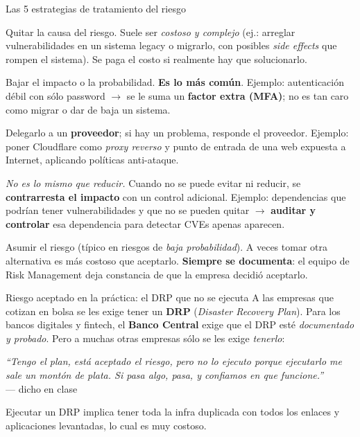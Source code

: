 \documentclass[11pt,a4paper]{article}
\newcommand{\prof}[1]{\par\medskip\noindent\textit{``#1''}\\[-2pt]\hspace*{1em}%
  {\footnotesize\textcolor{black!60}{--- dicho en clase}}\par\medskip\noindent}
\begin{document}
\begin{defbox}{Las 5 estrategias de tratamiento del riesgo}
\begin{description}[leftmargin=0pt,labelsep=0.4em,style=nextline,itemsep=3pt]
  \item[Evitarlo (avoid)] Quitar la causa del riesgo. Suele ser \emph{costoso y complejo}
        (ej.: arreglar vulnerabilidades en un sistema legacy o migrarlo, con posibles
        \emph{side effects} que rompen el sistema). Se paga el costo si realmente hay que
        solucionarlo.
  \item[Reducirlo (reduce/mitigate)] Bajar el impacto o la probabilidad. \textbf{Es lo más
        común}. Ejemplo: autenticación débil con sólo password $\to$ se le suma un
        \textbf{factor extra (MFA)}; no es tan caro como migrar o dar de baja un sistema.
  \item[Transferirlo (transfer)] Delegarlo a un \textbf{proveedor}; si hay un problema,
        responde el proveedor. Ejemplo: poner Cloudflare como \emph{proxy reverso} y punto de
        entrada de una web expuesta a Internet, aplicando políticas anti-ataque.
  \item[Compensarlo (compensate)] \emph{No es lo mismo que reducir.} Cuando no se puede evitar
        ni reducir, se \textbf{contrarresta el impacto} con un control adicional. Ejemplo:
        dependencias que podrían tener vulnerabilidades y que no se pueden quitar $\to$
        \textbf{auditar y controlar} esa dependencia para detectar CVEs apenas aparecen.
  \item[Aceptarlo (accept)] Asumir el riesgo (típico en riesgos de \emph{baja probabilidad}).
        A veces tomar otra alternativa es más costoso que aceptarlo. \textbf{Siempre se
        documenta}: el equipo de Risk Management deja constancia de que la empresa decidió
        aceptarlo.
\end{description}
\end{defbox}

\begin{anecbox}{Riesgo aceptado en la práctica: el DRP que no se ejecuta}
A las empresas que cotizan en bolsa se les exige tener un \textbf{DRP} (\emph{Disaster Recovery
Plan}). Para los bancos digitales y fintech, el \textbf{Banco Central} exige que el DRP esté
\emph{documentado y probado}. Pero a muchas otras empresas sólo se les exige \emph{tenerlo}:
\prof{Tengo el plan, está aceptado el riesgo, pero no lo ejecuto porque ejecutarlo me sale un
montón de plata. Si pasa algo, pasa, y confiamos en que funcione.} Ejecutar un DRP implica tener
toda la infra duplicada con todos los enlaces y aplicaciones levantadas, lo cual es muy costoso.
\end{anecbox}
\end{document}
